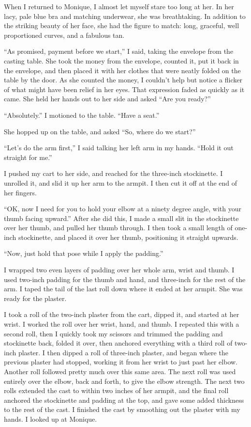     When I returned to Monique, I almost let myself stare too long at her. In her lacy, pale
blue bra and matching underwear, she was breathtaking. In addition to the striking beauty of her
face, she had the figure to match: long, graceful, well proportioned curves, and a fabulous tan.

    ``As promised, payment before we start,'' I said, taking the envelope from the casting
table. She took the money from the envelope, counted it, put it back in the envelope, and then
placed it with her clothes that were neatly folded on the table by the door. As she counted the
money, I couldn't help but notice a flicker of what might have been relief in her eyes. That
expression faded as quickly as it came. She held her hands out to her side and asked ``Are you
ready?''

    ``Absolutely.'' I motioned to the table. ``Have a seat.''

    She hopped up on the table, and asked ``So, where do we start?''

    ``Let's do the arm first,'' I said talking her left arm in my hands. ``Hold it out straight
for me.''

    I pushed my cart to her side, and reached for the three-inch stockinette. I unrolled it, and
slid it up her arm to the armpit. I then cut it off at the end of her fingers.

    ``OK, now I need for you to hold your elbow at a ninety degree angle, with your thumb facing
upward.'' After she did this, I made a small slit in the stockinette over her thumb, and pulled
her thumb through. I then took a small length of one-inch stockinette, and placed it over her
thumb, positioning it straight upwards.

    ``Now, just hold that pose while I apply the padding.''

    I wrapped two even layers of padding over her whole arm, wrist and thumb. I used two-inch
padding for the thumb and hand, and three-inch for the rest of the arm. I taped the tail of the
last roll down where it ended at her armpit. She was ready for the plaster.

    I took a roll of the two-inch plaster from the cart, dipped it, and started at her wrist. I
worked the roll over her wrist, hand, and thumb. I repeated this with a second roll, then I
quickly took my scissors and trimmed the padding and stockinette back, folded it over, then
anchored everything with a third roll of two-inch plaster. I then dipped a roll of three-inch
plaster, and began where the previous plaster had stopped, working it from her wrist to just
past her elbow. Another roll followed pretty much over this same area. The next roll was used
entirely over the elbow, back and forth, to give the elbow strength. The next two rolls extended
the cast to within two inches of her armpit, and the final roll anchored the stockinette and
padding at the top, and gave some added thickness to the rest of the cast. I finished the cast
by smoothing out the plaster with my hands. I looked up at Monique.

